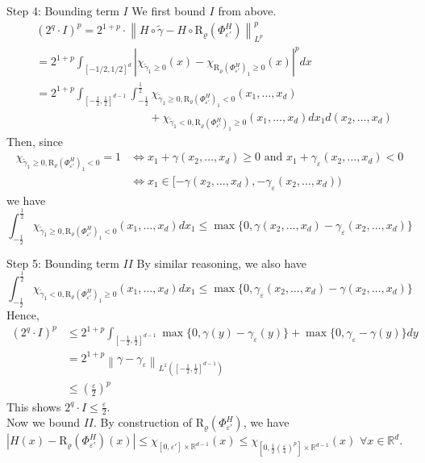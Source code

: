 \documentclass{if-beamer}
\newcommand{\norm}[2]{\left\lVert#1\right\rVert_{#2}}
\begin{document}
\begin{frame}{Step 4: Bounding term $I$}
    We first bound $I$ from above.\\
    {\small
    \begin{align*}
        &(2^q \cdot I)^p = 2^{1+p}\cdot \norm{H \circ \widetilde{\gamma} - H \circ \mathrm{R}_{\varrho}(\Phi_{\varepsilon'}^H) }{L^p}^p\\
        &= 2^{1+p} \int_{[-1/2,1/2]^d} \left|\chi_{\widetilde{\gamma}_1\geq 0}\left(x\right) - \chi_{\mathrm{R}_{\varrho}(\Phi_{\varepsilon'}^H)_1 \geq 0}\left(x\right)\right|^p dx\\
        &= 2^{1+p} \int_{[-\frac{1}{2},\frac{1}{2}]^{d-1}} \int_{-\frac{1}{2}}^{\frac{1}{2}} \chi_{\widetilde{\gamma}_1\geq 0, \mathrm{R}_{\varrho}(\Phi_{\varepsilon'}^H)_1 < 0}(x_1,\dots,x_d) \\
        & \qquad \qquad \qquad \qquad \qquad + \chi_{\widetilde{\gamma}_1< 0, \mathrm{R}_{\varrho}(\Phi_{\varepsilon'}^H)_1 \geq 0}(x_1,\dots,x_d)dx_1d(x_2,\dots,x_d)
    \end{align*}
    }%
    Then, since 
    {\small
    \begin{align*}
    \chi_{\widetilde{\gamma}_1 \geq 0, \mathrm{R}_{\varrho}(\Phi_{\varepsilon'}^H)_1 < 0} = 1
    &\iff x_1 + \gamma(x_2,\dots,x_d)\geq 0 \text{ and } x_1 + \gamma_{\varepsilon}(x_2,\dots,x_d)<0\\
    &\iff x_1 \in [-\gamma(x_2,\dots,x_d), -\gamma_{\varepsilon}(x_2,\dots,x_d)) 
    \end{align*}
    }%
    we have
    {\small
    $$\int_{-\frac{1}{2}}^{\frac{1}{2}} \chi_{\widetilde{\gamma}_1\geq 0, \mathrm{R}_{\varrho}(\Phi_{\varepsilon'}^H)_1 < 0}(x_1,\dots,x_d) dx_1 \leq \max \{0,\gamma(x_2,\dots,x_d)-\gamma_{\varepsilon}(x_2,\dots,x_d) \}$$
    }%
\end{frame}

\begin{frame}{Step 5: Bounding term $II$}
    By similar reasoning, we also have
    {\small
    $$\int_{-\frac{1}{2}}^{\frac{1}{2}} \chi_{\widetilde{\gamma}_1< 0, \mathrm{R}_{\varrho}(\Phi_{\varepsilon'}^H)_1 \geq 0}(x_1,\dots,x_d) dx_1 \leq \max \{0,\gamma_{\varepsilon}(x_2,\dots,x_d) - \gamma(x_2,\dots,x_d)\}$$
    }%
    Hence,
    {\small
    \begin{align*}
    (2^q \cdot I)^p &\leq 2^{1+p}\int_{[-\frac{1}{2},\frac{1}{2}]^{d-1}}\max\{0, \gamma(y) - \gamma_{\varepsilon}(y)\} + \max\{0, \gamma_{\varepsilon} - \gamma(y)\}dy\\
    &= 2^{1+p}\norm{\gamma - \gamma_{\varepsilon}}{L^1([-\frac{1}{2}, \frac{1}{2}]^{d-1})}\\
    &\leq \left(\frac{\varepsilon}{2}\right)^p
    \end{align*}
    }%
    This shows $2^q \cdot I \leq \frac{\varepsilon}{2}$.\\
    Now we bound $II$. By construction of $\mathrm{R}_{\varrho}(\Phi_{\varepsilon'}^H)$, we have $|H(x) - \mathrm{R}_{\varrho}(\Phi_{\varepsilon'}^H)(x)| \leq \chi_{[0, \varepsilon'] \times \mathbb{R}^{d-1}}(x) \leq \chi_{[0, \frac{1}{2}(\frac{\varepsilon}{4})^p] \times \mathbb{R}^{d-1}}(x)$ $\forall x \in \mathbb{R}^d$.
\end{frame}
\end{document}
